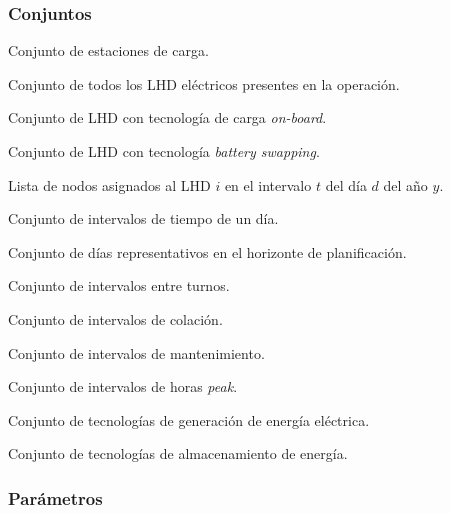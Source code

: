 \subsubsection*{Conjuntos}
\begin{description}[leftmargin=3cm, style=nextline]
    \item[$\mathcal{K}$] Conjunto de estaciones de carga.
    \item[$\mathcal{I}$] Conjunto de todos los LHD eléctricos presentes en la operación.
    \item[$\mathcal{I}_c$] Conjunto de LHD con tecnología de carga \textit{on-board}.
    \item[$\mathcal{I}_s$] Conjunto de LHD con tecnología \textit{battery swapping}.
    \item[$\mathcal{KI}$] 
    \item[$\mathcal{J}_{i,y,d,t}$] Lista de nodos asignados al LHD $i$ en el intervalo $t$ del día $d$ del año $y$.
    \item[$T$] Conjunto de intervalos de tiempo de un día.
    \item[$\mathcal{D}$] Conjunto de días representativos en el horizonte de planificación.
    \item[$\mathcal{Y}$] 
    \item[$T^{BS} \subseteq T$] Conjunto de intervalos entre turnos.
    \item[$T^{C} \subseteq T$] Conjunto de intervalos de colación.
    \item[$T^{M} \subseteq T$] Conjunto de intervalos de mantenimiento.
     \item[$T^{HP} \subseteq T$] Conjunto de intervalos de horas \textit{peak}.
    \item [$G $] Conjunto de tecnologías de generación de energía eléctrica.
    \item [$H $] Conjunto de tecnologías de almacenamiento de energía.
\end{description}

\subsubsection*{Parámetros}

